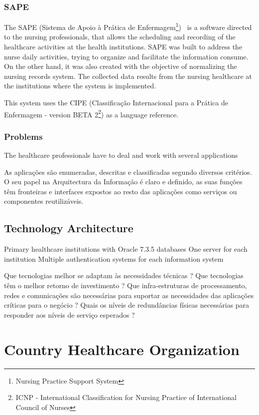 \subsubsection{SAPE}
The SAPE (Sistema de Apoio à Prática de Enfermagem\footnote{Nursing Practice Support System})~\citep{ACSS_SAPE2010} is a software directed to the nursing professionals, that allows the scheduling and recording of the healthcare activities at the health institutions. SAPE was built to address the nurse daily activities, trying to organize and facilitate the information consume. On the other hand, it was also created with the objective of normalizing the nursing records system. The collected data results from the nursing healthcare at the institutions where the system is implemented.

This system uses the CIPE (Classificação Internacional para a Prática de Enfermagem - version BETA 2\footnote{ICNP - International Classification for Nursing Practice of International Council of Nurses}) as a language reference. 


\subsubsection{Problems}

The healthcare professionals have to deal and work with several applications

As aplicações são enumeradas, descritas e classificadas segundo diversos critérios. O seu papel na Arquitectura da Informação é claro e definido, as suas funções têm fronteiras e interfaces expostos ao resto das aplicações como serviços ou componentes reutilizáveis.


\subsection{Technology Architecture}
Primary healthcare institutions with Oracle 7.3.5 databases
One server for each institution
Multiple authentication systems for each information system

Que tecnologias melhor se adaptam às necessidades técnicas ? Que tecnologias têm o melhor retorno de investimento ? Que infra-estruturas de processamento, redes e comunicações são necessárias para suportar as necessidades das aplicações críticas para o negócio ? Quais os níveis de redundâncias físicas necessárias para responder aos níveis de serviço esperados ?

\section{Country Healthcare Organization}

